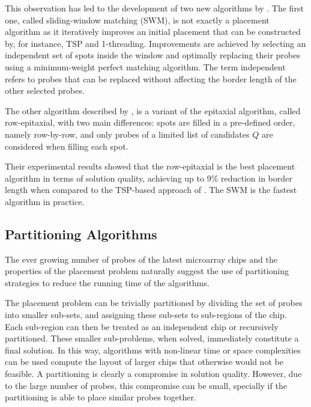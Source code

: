 \documentclass{bioinfo}
\begin{document}
This observation has led to the development of two new algorithms by \citealp{KAHNG03A}. The first one, called sliding-window matching (SWM), is not exactly a placement algorithm as it iteratively improves an initial placement that can be constructed by, for instance, TSP and 1-threading. Improvements are achieved by selecting an independent set of spots inside the window and optimally replacing their probes using a minimum-weight perfect matching algorithm. The term independent refers to probes that can be replaced without affecting the border length of the other selected probes.

The other algorithm described by \citealp{KAHNG03A}, is a variant of the epitaxial algorithm, called row-epitaxial, with two main differences: spots are filled in a pre-defined order, namely row-by-row, and only probes of a limited list of candidates $Q$ are considered when filling each spot.

Their experimental results showed that the row-epitaxial is the best placement algorithm in terms of solution quality, achieving up to 9\% reduction in border length when compared to the TSP-based approach of \citealp{HANNENHALLI02}. The SWM is the fastest algorithm in practice.

\subsection{Partitioning Algorithms}
\label{sec:partition}

The ever growing number of probes of the latest microarray chips and the  properties of the placement problem naturally suggest the use of partitioning strategies to reduce the running time of the algorithms.

The placement problem can be trivially partitioned by dividing the set of probes into smaller sub-sets, and assigning these sub-sets to sub-regions of the chip. Each sub-region can then be treated as an independent chip or recursively partitioned. These smaller sub-problems, when solved, immediately constitute a final solution. In this way, algorithms with non-linear time or space complexities can be used compute the layout of larger chips that otherwise would not be feasible. A partitioning is clearly a compromise in solution quality. However, due to the large number of probes, this compromise can be small, specially if the partitioning is able to place similar probes together.
\end{document}
